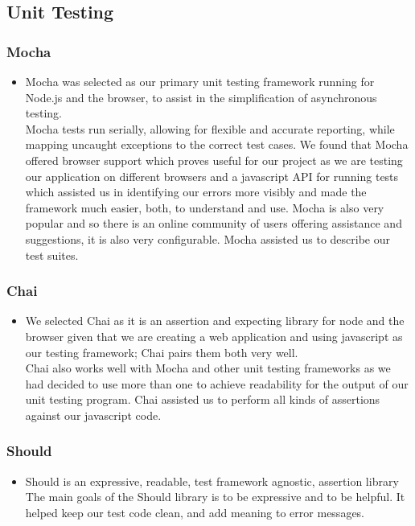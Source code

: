 \subsection{Unit Testing}
\subsubsection{Mocha}
\begin{itemize}
	\item Mocha was selected as our primary unit testing framework running for Node.js and the browser,
to assist in the simplification of asynchronous testing. \\
	Mocha tests run serially, allowing
 for flexible and accurate reporting, while mapping uncaught exceptions to the correct test 
 cases. We found that Mocha offered browser support which proves useful for our project as we are testing
our application on different browsers and a javascript API for running tests which assisted us in identifying our 
errors more visibly and made the framework much easier, both, to understand and use. Mocha is also very popular and 
so there is an online community of users offering assistance and suggestions, it is also very configurable. 
Mocha assisted us to describe our test suites.
\end{itemize}

\subsubsection{Chai}
\begin{itemize}
	\item We selected Chai as it is an assertion and expecting library for node and the browser given that we are
creating a web application and using javascript as our testing framework; Chai pairs them 
both very well. \\
Chai also works well with Mocha and other unit testing frameworks as we had
decided to use more than one to achieve readability for the output of our unit testing program. 
Chai assisted us to perform all kinds of assertions against our javascript code.
\end{itemize}

\subsubsection{Should}
\begin{itemize}
	\item Should is an expressive, readable, test framework agnostic, assertion library \\
	The main goals of the Should library is to be expressive and 
to be helpful. It helped keep our test code clean, and add meaning to error messages.
\end{itemize}
	

